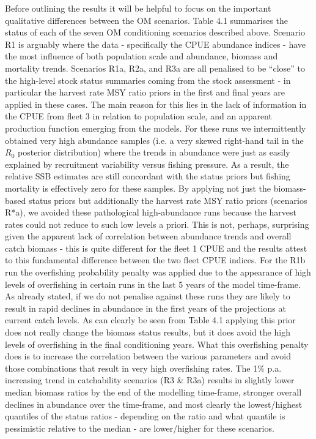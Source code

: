 \documentclass[11pt]{article}
\begin{document}
Before outlining the results it will be helpful to focus on the important qualitative differences between the OM scenarios. Table 4.1 summarises the status of each of the seven OM conditioning scenarios described above. Scenario R1 is arguably where the data - specifically the CPUE abundance indices - have the most influence of both population scale and abundance, biomass and mortality trends. Scenarios R1a, R2a, and R3a are all penalised to be “close” to the high-level stock status summaries coming from the stock assessment \cite{albsa} - in particular the harvest rate MSY ratio priors in the first and final years are applied in these cases. The main reason for this lies in the lack of information in the CPUE from fleet 3 in relation to population scale, and an apparent production function emerging from the models. For these runs we intermittently obtained very high abundance samples (i.e. a very skewed right-hand tail in the $R_0$ posterior distribution) where the trends in abundance were just as easily explained by recruitment variability versus fishing pressure. As a result, the relative SSB estimates are still concordant with the status priors but fishing mortality is effectively zero for these samples. By applying not just the biomass-based status priors but additionally the harvest rate MSY ratio priors (scenarios R*a), we avoided these pathological high-abundance runs because the harvest rates could not reduce to such low levels a priori. This is not, perhaps, surprising given the apparent lack of correlation between abundance trends and overall catch biomass - this is quite different for the fleet 1 CPUE and the results attest to this fundamental difference between the two fleet CPUE indices. For the R1b run the overfishing probability penalty was applied due to the appearance of high levels of overfishing in certain runs in the last 5 years of the model time-frame. As already stated, if we do not penalise against these runs they are likely to result in rapid declines in abundance in the first years of the projections at current catch levels. As can clearly be seen from Table 4.1 applying this prior does not really change the biomass status results, but it does avoid the high levels of overfishing in the final conditioning years. What this overfishing penalty does is to increase the correlation between the various parameters and avoid those combinations that result in very high overfishing rates. The 1\% p.a. increasing trend in catchability scenarios (R3 \& R3a) results in slightly lower median biomass ratios by the end of the modelling time-frame, stronger overall declines in abundance over the time-frame, and most clearly the lowest/highest quantiles of the status ratios - depending on the ratio and what quantile is pessimistic relative to the median - are lower/higher for these scenarios.
\end{document}
